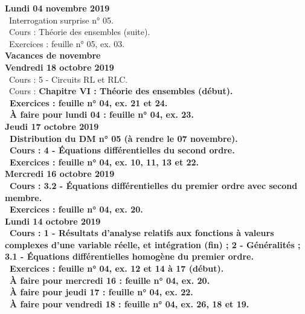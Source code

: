 \documentclass[12pt,a4paper]{article}
\begin{document}
\noindent\textbf{Lundi 04 novembre 2019}\\
\bu\ Interrogation surprise n° 05.\\
\bu\ Cours : Théorie des ensembles (suite).\\
\bu\ Exercices : feuille n° 05, ex. 03.\vspace{.4cm}\\
 
\noindent\textbf{ Vacances de novembre }\vspace{.4cm}\\
 
\noindent\textbf{Vendredi 18 octobre 2019}\\
\bu\ Cours : 5 - Circuits RL et RLC.\\
\bu\ Cours : \bf Chapitre VI \rm : Théorie des ensembles (début).\\
\bu\ Exercices : feuille n° 04, ex. 21 et 24.\\
\bu\ À faire pour lundi 04 : feuille n° 04, ex. 23.\vspace{.4cm}\\

\noindent\textbf{Jeudi 17 octobre 2019}\\
\bu\ Distribution du DM n° 05 (à rendre le 07 novembre).\\
\bu\ Cours : 4 - Équations différentielles du second ordre.\\
\bu\ Exercices : feuille n° 04, ex. 10, 11, 13 et 22.\vspace{.4cm}\\

\noindent\textbf{\bf Mercredi 16 octobre 2019}\\
\bu\ Cours : 3.2 - Équations différentielles du premier ordre avec second membre.\\
\bu\ Exercices : feuille n° 04, ex. 20.\vspace{.4cm}\\
  
\noindent\textbf{Lundi 14 octobre 2019}\\
\bu\ Cours : 1 - Résultats d'analyse relatifs aux fonctions à valeurs complexes d'une variable réelle, et 
intégration (fin) ; 2 - Généralités ; 3.1 - Équations différentielles homogène du premier ordre.\\
\bu\ Exercices : feuille n° 04, ex. 12 et 14 à 17 (début).\\
\bu\ À faire pour mercredi 16 : feuille n° 04, ex. 20.\\
\bu\ À faire pour jeudi 17 : feuille n° 04, ex. 22.\\
\bu\ À faire pour vendredi 18 : feuille n° 04, ex. 26, 18 et 19.\vspace{.4cm}\\
  
\end{document}
